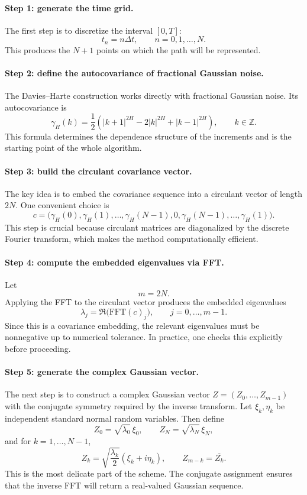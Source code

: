 \documentclass[a4paper,10pt,titlepage,oneside,openany]{book}
\theoremstyle{plain}
\theoremstyle{definition}
\theoremstyle{remark}
\newcommand{\1}{\mathbf{1}}
\begin{document}
\paragraph{Step 1: generate the time grid.} The first step is to discretize the interval \([0,T]\):
\[
t_n=n\Delta t,
\qquad n=0,1,\dots,N.
\]
This produces the \(N+1\) points on which the path will be represented.

\paragraph{Step 2: define the autocovariance of fractional Gaussian noise.} The Davies--Harte construction works directly with fractional Gaussian noise. Its autocovariance is
\[
\gamma_H(k)
=
\frac{1}{2}
\left(
|k+1|^{2H}
-
2|k|^{2H}
+
|k-1|^{2H}
\right),
\qquad k\in\mathbb{Z}.
\]
This formula determines the dependence structure of the increments and is the starting point of the whole algorithm.

\paragraph{Step 3: build the circulant covariance vector.} The key idea is to embed the covariance sequence into a circulant vector of length \(2N\). One convenient choice is
\[
c=
\bigl(
\gamma_H(0),\gamma_H(1),\dots,\gamma_H(N-1),0,
\gamma_H(N-1),\dots,\gamma_H(1)
\bigr).
\]
This step is crucial because circulant matrices are diagonalized by the discrete Fourier transform, which makes the method computationally efficient.

\paragraph{Step 4: compute the embedded eigenvalues via FFT.} Let
\[
m=2N.
\]
Applying the FFT to the circulant vector produces the embedded eigenvalues
\[
\lambda_j=\Re\bigl(\mathrm{FFT}(c)_j\bigr),
\qquad j=0,\dots,m-1.
\]
Since this is a covariance embedding, the relevant eigenvalues must be nonnegative up to numerical tolerance. In practice, one checks this explicitly before proceeding.

\paragraph{Step 5: generate the complex Gaussian vector.} The next step is to construct a complex Gaussian vector \(Z=(Z_0,\dots,Z_{m-1})\) with the conjugate symmetry required by the inverse transform. Let \(\xi_k,\eta_k\) be independent standard normal random variables. Then define
\[
Z_0=\sqrt{\lambda_0}\,\xi_0,
\qquad
Z_N=\sqrt{\lambda_N}\,\xi_N,
\]
and for \(k=1,\dots,N-1\),
\[
Z_k
=
\sqrt{\frac{\lambda_k}{2}}
\left(\xi_k+i\eta_k\right),
\qquad
Z_{m-k}=\overline{Z_k}.
\]
This is the most delicate part of the scheme. The conjugate assignment ensures that the inverse FFT will return a real-valued Gaussian sequence.
\end{document}
